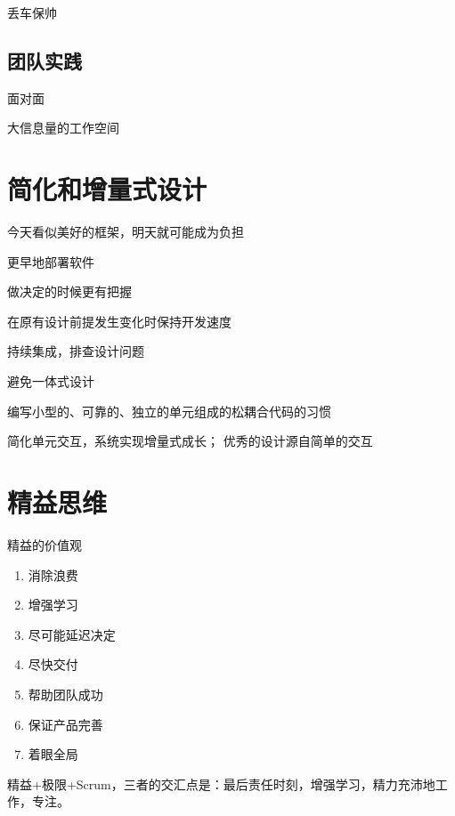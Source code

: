 \documentclass{ctexart}
\begin{document}
丢车保帅

\subsection{团队实践}
面对面

大信息量的工作空间

\section{简化和增量式设计}

今天看似美好的框架，明天就可能成为负担

更早地部署软件

做决定的时候更有把握

在原有设计前提发生变化时保持开发速度

持续集成，排查设计问题

避免一体式设计

编写小型的、可靠的、独立的单元组成的松耦合代码的习惯

简化单元交互，系统实现增量式成长；
优秀的设计源自简单的交互


\section{精益思维}
精益的价值观
\begin{enumerate}
\item  {消除浪费}
\item {增强学习}
\item {尽可能延迟决定}
\item {尽快交付} 
\item {帮助团队成功} 
\item {保证产品完善} 
\item {着眼全局}
\end{enumerate}

精益+极限+Scrum，三者的交汇点是：最后责任时刻，增强学习，精力充沛地工作，专注。
\end{document}
